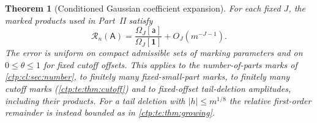 \documentclass[11pt,a4paper]{article}
\numberwithin{equation}{section}
\newtheorem{theorem}{Theorem}[section]
\theoremstyle{definition}
\theoremstyle{remark}
\newcommand{\amp}{\mathsf A}
\begin{document}
\begin{theorem}[Conditioned Gaussian coefficient expansion]\label{ctp:te:thm:operator}
For each fixed $J$, the marked products used in Part~II satisfy
\begin{equation}\label{ctp:te:eq:operator-ratio}
 \mathcal R_n(\amp)=\frac{\Omega_J[\mathsf a]}{\Omega_J[\mathbf1]}
 +O_J(m^{-J-1}).
\end{equation}
The error is uniform on compact admissible sets of marking parameters and on
$0\le\theta\le1$ for fixed cutoff offsets. This applies to the
number-of-parts marks of \cref{ctp:cl:sec:number}, to finitely many
fixed-small-part marks, to finitely many cutoff marks
(\cref{ctp:te:thm:cutoff}) and to fixed-offset tail-deletion amplitudes,
including their products. For a tail deletion with $|h|\le m^{1/8}$ the
relative first-order remainder is instead bounded as in
\cref{ctp:te:thm:growing}.
\end{theorem}
\end{document}
